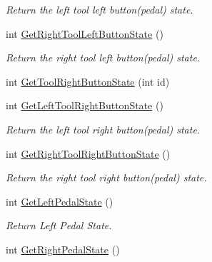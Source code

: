 \begin{DoxyCompactItemize}
\begin{DoxyCompactList}\small\item\em Return the left tool left button(pedal) state. \item\end{DoxyCompactList}\item 
\hypertarget{classvtkIHP_aa15214be5ce985ac94b5766d69ae7c7b}{
int \hyperlink{classvtkIHP_aa15214be5ce985ac94b5766d69ae7c7b}{GetRightToolLeftButtonState} ()}
\label{classvtkIHP_aa15214be5ce985ac94b5766d69ae7c7b}

\begin{DoxyCompactList}\small\item\em Return the right tool left button(pedal) state. \item\end{DoxyCompactList}\item 
int \hyperlink{classvtkIHP_a3b90d186241d7839a7b17fcf758ca680}{GetToolRightButtonState} (int id)
\item 
\hypertarget{classvtkIHP_a894b14cb3f88565f8171d62e6af83c77}{
int \hyperlink{classvtkIHP_a894b14cb3f88565f8171d62e6af83c77}{GetLeftToolRightButtonState} ()}
\label{classvtkIHP_a894b14cb3f88565f8171d62e6af83c77}

\begin{DoxyCompactList}\small\item\em Return the left tool right button(pedal) state. \item\end{DoxyCompactList}\item 
\hypertarget{classvtkIHP_a219b38800a6b24195c79dba5ca3aab38}{
int \hyperlink{classvtkIHP_a219b38800a6b24195c79dba5ca3aab38}{GetRightToolRightButtonState} ()}
\label{classvtkIHP_a219b38800a6b24195c79dba5ca3aab38}

\begin{DoxyCompactList}\small\item\em Return the right tool right button(pedal) state. \item\end{DoxyCompactList}\item 
\hypertarget{classvtkIHP_a5c9c2c133325409c40ad6ee8b3b4595b}{
int \hyperlink{classvtkIHP_a5c9c2c133325409c40ad6ee8b3b4595b}{GetLeftPedalState} ()}
\label{classvtkIHP_a5c9c2c133325409c40ad6ee8b3b4595b}

\begin{DoxyCompactList}\small\item\em Return Left Pedal State. \item\end{DoxyCompactList}\item 
\hypertarget{classvtkIHP_abfbe46870599130ab33058234c794acb}{
int \hyperlink{classvtkIHP_abfbe46870599130ab33058234c794acb}{GetRightPedalState} ()}
\label{classvtkIHP_abfbe46870599130ab33058234c794acb}


\end{DoxyCompactItemize}

